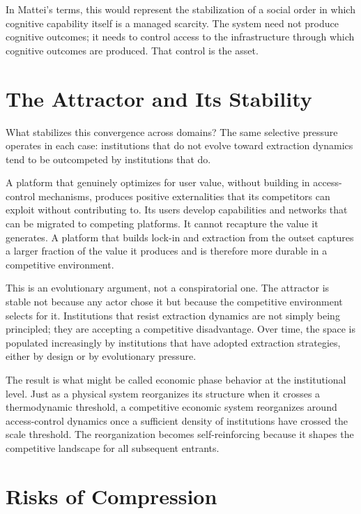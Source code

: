 \documentclass[12pt, a4paper]{article}
\begin{document}
In Mattei's terms, this would represent the stabilization of a social order in
which cognitive capability itself is a managed scarcity. The system need not
produce cognitive outcomes; it needs to control access to the infrastructure
through which cognitive outcomes are produced. That control is the asset.

\section{The Attractor and Its Stability}

What stabilizes this convergence across domains? The same selective pressure
operates in each case: institutions that do not evolve toward extraction
dynamics tend to be outcompeted by institutions that do.

A platform that genuinely optimizes for user value, without building in
access-control mechanisms, produces positive externalities that its
competitors can exploit without contributing to. Its users develop
capabilities and networks that can be migrated to competing platforms. It
cannot recapture the value it generates. A platform that builds lock-in and
extraction from the outset captures a larger fraction of the value it
produces and is therefore more durable in a competitive environment.

This is an evolutionary argument, not a conspiratorial one. The attractor
is stable not because any actor chose it but because the competitive
environment selects for it. Institutions that resist extraction dynamics are
not simply being principled; they are accepting a competitive disadvantage.
Over time, the space is populated increasingly by institutions that have
adopted extraction strategies, either by design or by evolutionary pressure.

The result is what might be called economic phase behavior at the
institutional level. Just as a physical system reorganizes its structure when
it crosses a thermodynamic threshold, a competitive economic system
reorganizes around access-control dynamics once a sufficient density of
institutions have crossed the scale threshold. The reorganization becomes
self-reinforcing because it shapes the competitive landscape for all
subsequent entrants.

\section{Risks of Compression}
\end{document}
